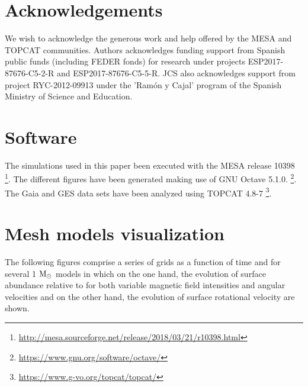 \documentclass[fleqn,usenatbib]{mnras}
\begin{document}
\begin{ceqn}
\section*{Acknowledgements}
We wish to acknowledge the generous work and help offered by the MESA and TOPCAT communities. Authors acknowledges funding support from Spanish public funds (including FEDER fonds) for research under projects ESP2017-87676-C5-2-R and ESP2017-87676-C5-5-R. JCS also acknowledges support from project RYC-2012-09913 under the 'Ram\'on y Cajal' program of the Spanish Ministry of Science and Education.

\section*{Software}
The simulations used in this paper been executed with the MESA release 10398 \footnote{\url{http://mesa.sourceforge.net/release/2018/03/21/r10398.html}}. The different figures have been generated making use of GNU Octave 5.1.0. \footnote{\url{https://www.gnu.org/software/octave/}}. The Gaia and GES data sets have been analyzed using TOPCAT 4.8-7 \footnote{\url{https://www.g-vo.org/topcat/topcat/}}. 











\appendix

\section{Mesh models visualization}
The following figures comprise a series of grids as a function of time and for several 1 $\mathrm{M}_\odot$ models in which on the one hand, the evolution of surface  abundance relative to  for both variable magnetic field intensities and angular velocities and on the other hand, the evolution of surface rotational velocity are shown.


\end{ceqn}
\end{document}
